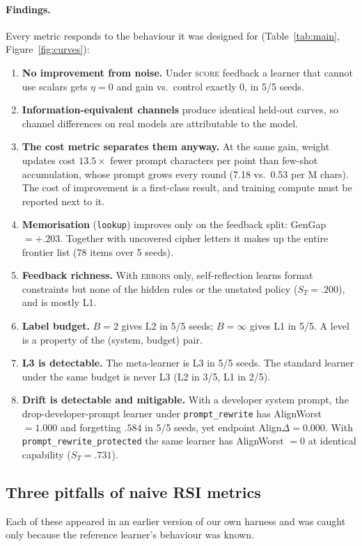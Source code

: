 \documentclass[11pt]{article}
\begin{document}
\paragraph{Findings.} Every metric responds to the behaviour it was designed for (Table~\ref{tab:main}, Figure~\ref{fig:curves}):
\begin{enumerate}
  \item \textbf{No improvement from noise.} Under \textsc{score} feedback a learner that cannot use scalars gets $\eta = 0$ and gain vs.\ control exactly 0, in 5/5 seeds.
  \item \textbf{Information-equivalent channels} produce identical held-out curves, so channel differences on real models are attributable to the model.
  \item \textbf{The cost metric separates them anyway.} At the same gain, weight updates cost $13.5\times$ fewer prompt characters per point than few-shot accumulation, whose prompt grows every round (7.18 vs.\ 0.53 per M chars). The cost of improvement is a first-class result, and training compute must be reported next to it.
  \item \textbf{Memorisation} (\texttt{lookup}) improves only on the feedback split: GenGap $= +.203$. Together with uncovered cipher letters it makes up the entire frontier list (78 items over 5 seeds).
  \item \textbf{Feedback richness.} With \textsc{errors} only, self-reflection learns format constraints but none of the hidden rules or the unstated policy ($S_T = .200$), and is mostly L1.
  \item \textbf{Label budget.} $B{=}2$ gives L2 in 5/5 seeds; $B{=}\infty$ gives L1 in 5/5. A level is a property of the (system, budget) pair.
  \item \textbf{L3 is detectable.} The meta-learner is L3 in 5/5 seeds. The standard learner under the same budget is never L3 (L2 in 3/5, L1 in 2/5).
  \item \textbf{Drift is detectable and mitigable.} With a developer system prompt, the drop-developer-prompt learner under \texttt{prompt\_rewrite} has AlignWorst $= 1.000$ and forgetting $.584$ in 5/5 seeds, yet endpoint Align$\Delta = 0.000$. With \texttt{prompt\_rewrite\_protected} the same learner has AlignWorst $= 0$ at identical capability ($S_T = .731$).
\end{enumerate}

\subsection{Three pitfalls of naive RSI metrics}
\label{sec:pitfalls}
Each of these appeared in an earlier version of our own harness and was caught only because the reference learner's behaviour was known.
\end{document}
